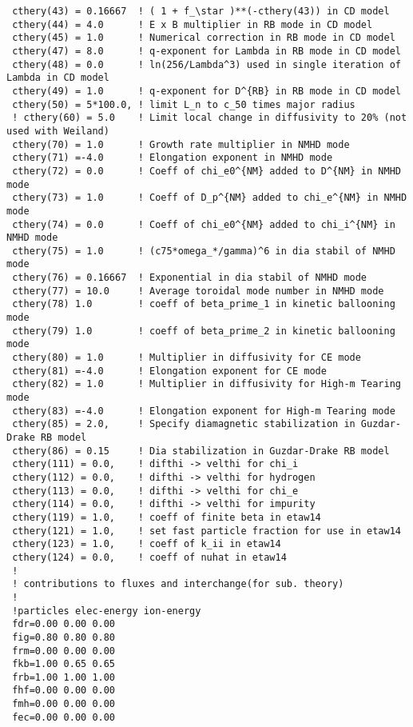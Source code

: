\begin{verbatim}
 cthery(43) = 0.16667  ! ( 1 + f_\star )**(-cthery(43)) in CD model
 cthery(44) = 4.0      ! E x B multiplier in RB mode in CD model
 cthery(45) = 1.0      ! Numerical correction in RB mode in CD model
 cthery(47) = 8.0      ! q-exponent for Lambda in RB mode in CD model
 cthery(48) = 0.0      ! ln(256/Lambda^3) used in single iteration of Lambda in CD model
 cthery(49) = 1.0      ! q-exponent for D^{RB} in RB mode in CD model
 cthery(50) = 5*100.0, ! limit L_n to c_50 times major radius
 ! cthery(60) = 5.0    ! Limit local change in diffusivity to 20% (not used with Weiland)
 cthery(70) = 1.0      ! Growth rate multiplier in NMHD mode
 cthery(71) =-4.0      ! Elongation exponent in NMHD mode
 cthery(72) = 0.0      ! Coeff of chi_e0^{NM} added to D^{NM} in NMHD mode
 cthery(73) = 1.0      ! Coeff of D_p^{NM} added to chi_e^{NM} in NMHD mode
 cthery(74) = 0.0      ! Coeff of chi_e0^{NM} added to chi_i^{NM} in NMHD mode
 cthery(75) = 1.0      ! (c75*omega_*/gamma)^6 in dia stabil of NMHD mode
 cthery(76) = 0.16667  ! Exponential in dia stabil of NMHD mode
 cthery(77) = 10.0     ! Average toroidal mode number in NMHD mode
 cthery(78) 1.0        ! coeff of beta_prime_1 in kinetic ballooning mode
 cthery(79) 1.0        ! coeff of beta_prime_2 in kinetic ballooning mode
 cthery(80) = 1.0      ! Multiplier in diffusivity for CE mode
 cthery(81) =-4.0      ! Elongation exponent for CE mode
 cthery(82) = 1.0      ! Multiplier in diffusivity for High-m Tearing mode
 cthery(83) =-4.0      ! Elongation exponent for High-m Tearing mode
 cthery(85) = 2.0,     ! Specify diamagnetic stabilization in Guzdar-Drake RB model
 cthery(86) = 0.15     ! Dia stabilization in Guzdar-Drake RB model
 cthery(111) = 0.0,    ! difthi -> velthi for chi_i
 cthery(112) = 0.0,    ! difthi -> velthi for hydrogen
 cthery(113) = 0.0,    ! difthi -> velthi for chi_e
 cthery(114) = 0.0,    ! difthi -> velthi for impurity
 cthery(119) = 1.0,    ! coeff of finite beta in etaw14
 cthery(121) = 1.0,    ! set fast particle fraction for use in etaw14
 cthery(123) = 1.0,    ! coeff of k_ii in etaw14
 cthery(124) = 0.0,    ! coeff of nuhat in etaw14
 !
 ! contributions to fluxes and interchange(for sub. theory)
 !
 !particles elec-energy ion-energy
 fdr=0.00 0.00 0.00
 fig=0.80 0.80 0.80
 frm=0.00 0.00 0.00
 fkb=1.00 0.65 0.65
 frb=1.00 1.00 1.00
 fhf=0.00 0.00 0.00
 fmh=0.00 0.00 0.00
 fec=0.00 0.00 0.00
 
                \end{verbatim}


